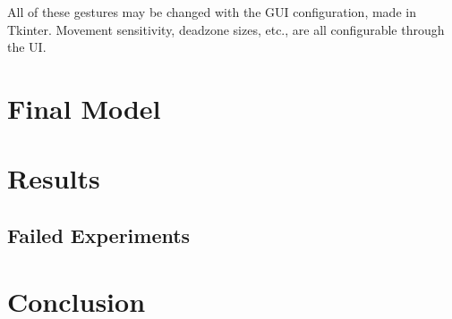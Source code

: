 \documentclass{article}
\begin{document}
All of these gestures may be changed with the GUI configuration, made in Tkinter. Movement sensitivity, deadzone sizes, etc., are all configurable through the UI.

\section{Final Model}


\section{Results}
\subsection{Failed Experiments}
\section{Conclusion}


\pagebreak
\nocite{*} %
\printbibliography %
\end{document}
